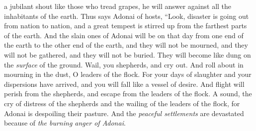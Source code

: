 \begin{biblechapter}
a jubilant shout like those who tread grapes, 
he will answer against all the inhabitants of the earth.
\verse Thus says Adonai of hosts,
\verse “Look, disaster is going out from nation to nation, 
and a great tempest is stirred up from the farthest parts of the earth.
\verse And the slain ones of Adonai will be on that day 
from one end of the earth to the other end of the earth, 
and they will not be mourned, 
and they will not be gathered, 
and they will not be buried. 
They will become like dung on the \textit{surface} of the ground.
\verse Wail, you shepherds, and cry out. 
And roll about in mourning in the dust, O leaders of the flock. 
For your days of slaughter and your dispersions have arrived, 
and you will fall like a vessel of desire.
\verse And flight will perish from the shepherds, 
and escape from the leaders of the flock.
\verse A sound, the cry of distress of the shepherds 
and the wailing of the leaders of the flock, 
for Adonai is despoiling their pasture.
\verse And the \textit{peaceful settlements} are devastated 
because of \textit{the burning anger of Adonai}.
\end{biblechapter}

